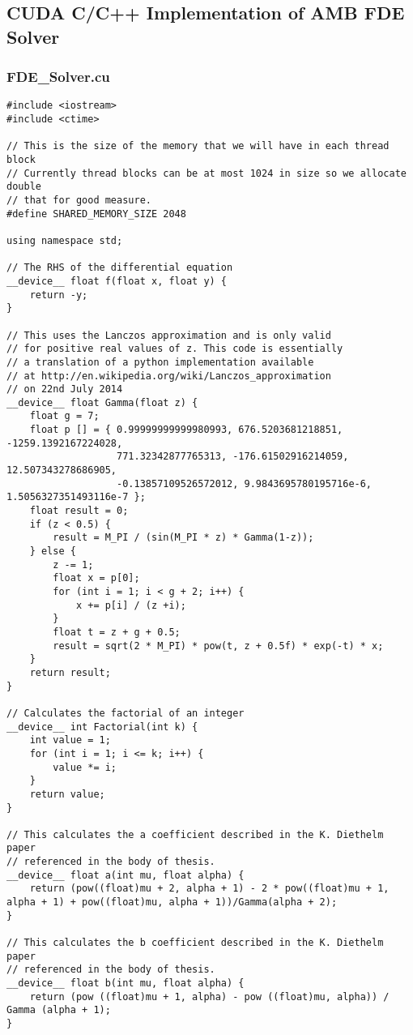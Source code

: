 \subsection{CUDA C/C++ Implementation of AMB FDE Solver}
\subsubsection{FDE\_Solver.cu}

\lstset{language=C++}
\begin{lstlisting}
#include <iostream>
#include <ctime>

// This is the size of the memory that we will have in each thread block
// Currently thread blocks can be at most 1024 in size so we allocate double
// that for good measure.
#define SHARED_MEMORY_SIZE 2048

using namespace std;

// The RHS of the differential equation
__device__ float f(float x, float y) {
    return -y;
}

// This uses the Lanczos approximation and is only valid
// for positive real values of z. This code is essentially
// a translation of a python implementation available
// at http://en.wikipedia.org/wiki/Lanczos_approximation
// on 22nd July 2014
__device__ float Gamma(float z) {
    float g = 7;
    float p [] = { 0.99999999999980993, 676.5203681218851, -1259.1392167224028,
				   771.32342877765313, -176.61502916214059, 12.507343278686905,
				   -0.13857109526572012, 9.9843695780195716e-6, 1.5056327351493116e-7 };
	float result = 0;
	if (z < 0.5) {
	    result = M_PI / (sin(M_PI * z) * Gamma(1-z));
	} else {
	    z -= 1;
	    float x = p[0];
	    for (int i = 1; i < g + 2; i++) {
	        x += p[i] / (z +i);
	    }
	    float t = z + g + 0.5;
	    result = sqrt(2 * M_PI) * pow(t, z + 0.5f) * exp(-t) * x;
	}
	return result;
}

// Calculates the factorial of an integer
__device__ int Factorial(int k) {
    int value = 1;
    for (int i = 1; i <= k; i++) {
        value *= i;
    }
    return value;
}

// This calculates the a coefficient described in the K. Diethelm paper
// referenced in the body of thesis.
__device__ float a(int mu, float alpha) {
    return (pow((float)mu + 2, alpha + 1) - 2 * pow((float)mu + 1, alpha + 1) + pow((float)mu, alpha + 1))/Gamma(alpha + 2);
}

// This calculates the b coefficient described in the K. Diethelm paper
// referenced in the body of thesis.
__device__ float b(int mu, float alpha) {
    return (pow ((float)mu + 1, alpha) - pow ((float)mu, alpha)) / Gamma (alpha + 1);
}


\end{lstlisting}
